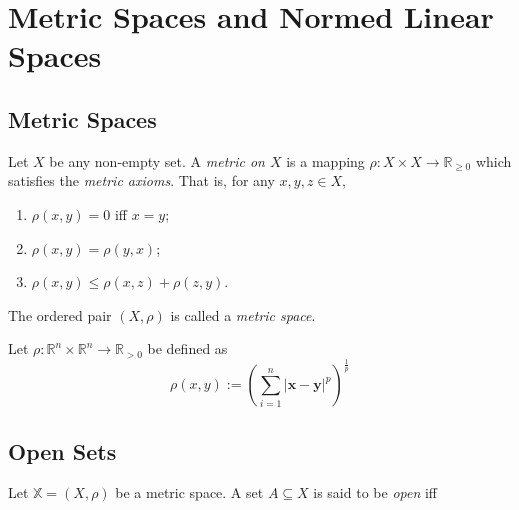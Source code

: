 \chapter{Metric Spaces and Normed Linear Spaces}



\section{Metric Spaces}

\begin{definition}
	\label{def: metric space}
	Let $X$ be any non-empty set. A \textit{metric on $X$} is a mapping $\rho: X  \times X \to \mathbb R_{\ge 0}$ which satisfies the \textit{metric axioms}. That is, for any $x, y, z \in X$,
	\begin{enumerate}[M1.]
		\item
		\label{def: metric space: identity of indiscernibles}
		$\rho(x,y) = 0$ iff $x = y$;
		
		\item
		\label{def: metric space: symmetry}
		$\rho(x,y) = \rho(y, x)$;
		
		\item
		\label{def: triangle inequality}
		$\rho(x,y) \le \rho(x, z) + \rho(z, y)$.
	\end{enumerate}
	
	The ordered pair $(X, \rho)$ is called a \textit{metric space}.
\end{definition}


\begin{example}
	Let $\rho: \mathbb R^n \times \mathbb R^n \to \mathbb R_{>0}$ be defined as
	$$
	\rho(x,y) := \left( \sum_{i = 1}^n |\mathbf x - \mathbf y|^p \right)^\frac{1}{p}
	$$
\end{example}


\section{Open Sets}


\begin{definition}
	Let $\mathbb X = (X, \rho)$ be a metric space. A set $A \subseteq X$ is said to be \textit{open} iff
\end{definition}